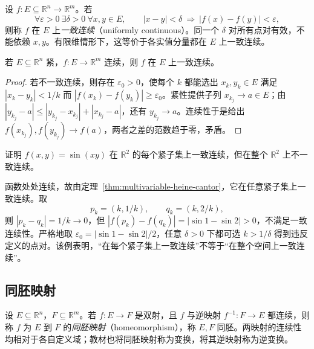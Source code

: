 \begin{definition}
\label{def:uniform-continuity-vector-function}
设 $f:E\subseteq\mathbb R^n\to\mathbb R^m$。若
\[
    \forall\varepsilon>0\ \exists\delta>0\ \forall x,y\in E,
    \qquad |x-y|<\delta\ \Longrightarrow\ |f(x)-f(y)|<\varepsilon,
\]
则称 $f$ 在 $E$ 上\emph{一致连续}（uniformly continuous）。同一个 $\delta$ 对所有点对有效，不能依赖 $x,y$。有限维情形下，这等价于各实值分量都在 $E$ 上一致连续。
\end{definition}

\begin{theorem}[紧集上的一致连续性]
\label{thm:multivariable-heine-cantor}
若 $E\subseteq\mathbb R^n$ 紧，$f:E\to\mathbb R^m$ 连续，则 $f$ 在 $E$ 上一致连续。
\end{theorem}

\begin{proof}
若不一致连续，则存在 $\varepsilon_0>0$，使每个 $k$ 都能选出 $x_k,y_k\in E$ 满足 $|x_k-y_k|<1/k$ 而 $|f(x_k)-f(y_k)|\geq\varepsilon_0$。紧性提供子列 $x_{k_j}\to a\in E$；由 $|y_{k_j}-a|\leq|y_{k_j}-x_{k_j}|+|x_{k_j}-a|$，还有 $y_{k_j}\to a$。连续性于是给出 $f(x_{k_j}),f(y_{k_j})\to f(a)$，两者之差的范数趋于零，矛盾。
\end{proof}

\begin{example}
\label{ex:sine-product-not-uniformly-continuous}
证明 $f(x,y)=\sin(xy)$ 在 $\mathbb R^2$ 的每个紧子集上一致连续，但在整个 $\mathbb R^2$ 上不一致连续。
\end{example}

\begin{solve}
函数处处连续，故由定理~\ref{thm:multivariable-heine-cantor}，它在任意紧子集上一致连续。取
\[
    p_k=(k,1/k),\qquad q_k=(k,2/k),
\]
则 $|p_k-q_k|=1/k\to0$，但 $|f(p_k)-f(q_k)|=|\sin1-\sin2|>0$，不满足一致连续性。严格地取 $\varepsilon_0=|\sin1-\sin2|/2$，任意 $\delta>0$ 下都可选 $k>1/\delta$ 得到违反定义的点对。该例表明，“在每个紧子集上一致连续”不等于“在整个空间上一致连续”。
\end{solve}

\subsection{同胚映射}
\label{subsec:homeomorphisms}

\begin{definition}
\label{def:euclidean-homeomorphism}
设 $E\subseteq\mathbb R^n$，$F\subseteq\mathbb R^m$。若 $f:E\to F$ 是双射，且 $f$ 与逆映射 $f^{-1}:F\to E$ 都连续，则称 $f$ 为 $E$ 到 $F$ 的\emph{同胚映射}（homeomorphism），称 $E,F$ 同胚。两映射的连续性均相对于各自定义域；教材也将同胚映射称为变换，将其逆映射称为逆变换。
\end{definition}

